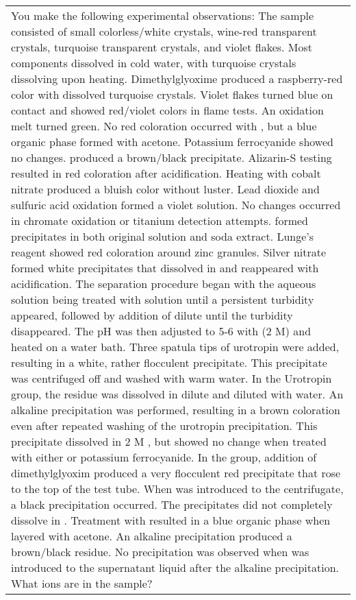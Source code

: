 \begin{xltabular}{\textwidth}{X}
            You make the following experimental observations: The sample consisted of small colorless/white crystals, wine-red transparent crystals, turquoise transparent crystals, and violet flakes. Most components dissolved in cold water, with turquoise crystals dissolving upon heating. Dimethylglyoxime produced a raspberry-red color with dissolved turquoise crystals. Violet flakes turned blue on contact and showed red/violet colors in flame tests. An oxidation melt turned green. No red coloration occurred with , but a blue organic phase formed with acetone. Potassium ferrocyanide showed no changes.  produced a brown/black precipitate. Alizarin-S testing resulted in red coloration after acidification. Heating with cobalt nitrate produced a bluish color without luster. Lead dioxide and sulfuric acid oxidation formed a violet solution. No changes occurred in chromate oxidation or titanium detection attempts.  formed precipitates in both original solution and soda extract. Lunge's reagent showed red coloration around zinc granules. Silver nitrate formed white precipitates that dissolved in  and reappeared with  acidification. The separation procedure began with the aqueous solution being treated with  solution until a persistent turbidity appeared, followed by addition of dilute  until the turbidity disappeared. The pH was then adjusted to 5-6 with  (2 M) and heated on a water bath. Three spatula tips of urotropin were added, resulting in a white, rather flocculent precipitate. This precipitate was centrifuged off and washed with warm water. In the Urotropin group, the residue was dissolved in dilute  and diluted with water. An alkaline precipitation was performed, resulting in a brown coloration even after repeated washing of the urotropin precipitation. This precipitate dissolved in 2 M , but showed no change when treated with either  or potassium ferrocyanide. In the  group, addition of dimethylglyoxim produced a very flocculent red precipitate that rose to the top of the test tube. When  was introduced to the centrifugate, a black precipitation occurred. The precipitates did not completely dissolve in . Treatment with  resulted in a blue organic phase when layered with acetone. An alkaline precipitation produced a brown/black residue. No precipitation was observed when  was introduced to the supernatant liquid after the alkaline precipitation.  What ions are in the sample? \\

\end{xltabular}
